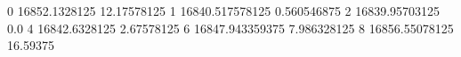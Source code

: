 0 16852.1328125 12.17578125
1 16840.517578125 0.560546875
2 16839.95703125 0.0
4 16842.6328125 2.67578125
6 16847.943359375 7.986328125
8 16856.55078125 16.59375
